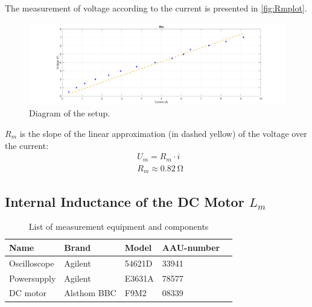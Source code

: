 The measurement of voltage according to the current is presented in \autoref{fig:Rmplot}.
\begin{figure}[htbp]
	\includegraphics[width=1\textwidth]{figures/modeling/Motor/Rmplot-converted-to-pdf}
	\caption{Diagram of the setup.} \label{fig:Rmplot}
\end{figure}

$R_m$ is the slope of the linear approximation (in dashed yellow) of the voltage over the current: 
\begin{subequations} \label{eq:LaEq}
	\begin{flalign}
		&U_m = R_m \cdot i \\
		&R_m \approx \SI{0.82}{\ohm}
	\end{flalign}
\end{subequations}


\subsection{Internal Inductance of the DC Motor $L_m$}
\begin{table}[htbp]
	\centering
	\caption{List of measurement equipment and components}\label{tab_appendix:LaSetUp}

	\begin{tabularx}{\textwidth}{lXXXX}
		Name 				& Brand	& Model & AAU-number									\\ \toprule \rowcolor{lightGrey}
		Oscilloscope	& Agilent & 54621D & 33941 	\\
		Powersupply	& Agilent & E3631A & 78577\\ \rowcolor{lightGrey}
		DC motor & Alsthom BBC & F9M2& 08339 
	\end{tabularx}
\end{table}

